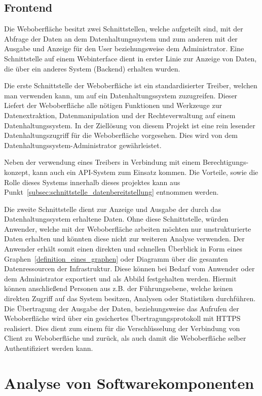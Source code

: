 \subsection{Frontend}
Die Weboberfläche besitzt zwei Schnittstellen, welche aufgeteilt sind, mit der
Abfrage der Daten an dem Datenhaltungssystem und zum anderen mit der Ausgabe
und Anzeige für den User beziehungsweise dem Administrator. Eine Schnittstelle
auf einem Webinterface dient in erster Linie zur Anzeige von Daten, die über
ein anderes System (Backend) erhalten wurden.

Die erste Schnittstelle der Weboberfläche ist ein standardisierter Treiber,
welchen man verwenden kann, um auf ein Datenhaltungssystem zuzugreifen. Dieser
Liefert der Weboberfläche alle nötigen Funktionen und Werkzeuge zur
Datenextraktion, Datenmanipulation und der Rechteverwaltung auf einem
Datenhaltungssystem. In der Ziellösung von diesem Projekt ist eine rein
lesender Datenhaltungszugriff für die Weboberfläche vorgesehen. Dies wird von
dem Datenhaltungssystem-Administrator gewährleistet.

Neben der verwendung eines Treibers in Verbindung mit einem Berechtigungs-
konzept, kann auch ein API-System zum Einsatz kommen. Die Vorteile, sowie die
Rolle dieses Systems innerhalb dieses projektes kann aus
Punkt~\ref{subsec:schnittstelle_datenbereitstellung} entnommen werden.

Die zweite Schnittstelle dient zur Anzeige und Ausgabe der durch das
Datenhaltungssystem erhaltene Daten. Ohne diese Schnittstelle, würden Anwender,
welche mit der Weboberfläche arbeiten möchten nur unstrukturierte Daten
erhalten und könnten diese nicht zur weiteren Analyse verwenden. Der Anwender
erhält somit einen direkten und schnellen Überblick in Form eines
Graphen~\ref{definition_eines_graphen} oder Diagramm über die gesamten
Datenressourcen der Infrastruktur. Diese können bei Bedarf vom Anwender oder
dem Administrator exportiert und als Abbild festgehalten werden. Hiermit können
anschließend Personen aus z.B. der Führungsebene, welche keinen direkten
Zugriff auf das System besitzen, Analysen oder Statistiken durchführen. Die
Übertragung der Ausgabe der Daten, beziehungsweise das Aufrufen der
Weboberfläche wird über ein gesichertes Übertragungsprotokoll mit HTTPS
realisiert. Dies dient zum einem für die Verschlüsselung der Verbindung von
Client zu Weboberfläche und zurück, als auch damit die Weboberfläche selber
Authentifiziert werden kann.
\mr%

\section{Analyse von Softwarekomponenten}
